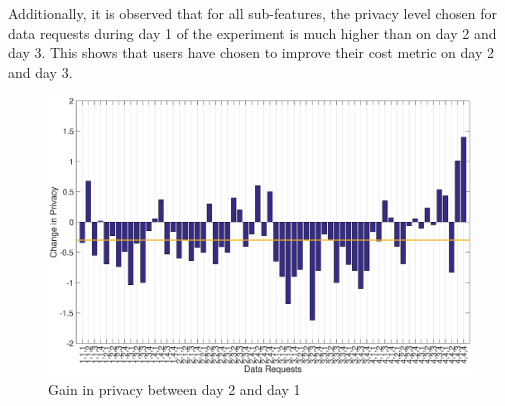 Additionally, it is observed that for all sub-features, the privacy level chosen for data requests during day 1 of the experiment is much higher than on day 2 and day 3. This shows that users have chosen to improve their cost metric on day 2 and day 3.

%
%

\begin{figure}[ht!]
\centering
\includegraphics[width=\textwidth]{./images/day2_day1}
\caption{Gain in privacy between day 2 and day 1}
\label{fig:day2_day1}
\end{figure}


